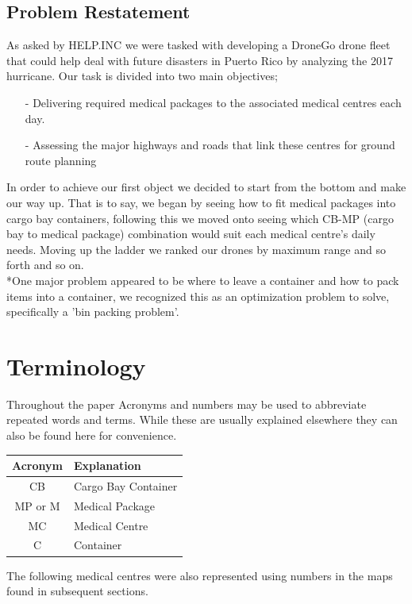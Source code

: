 \documentclass[a4paper,12pt]{article}
\begin{document}
\subsection{Problem Restatement}
As asked by HELP.INC we were tasked with developing a DroneGo drone fleet that could help deal with future disasters in
Puerto Rico by analyzing the 2017 hurricane. Our task is divided into two main objectives;
\begin{itemize}
\item[-]Delivering required medical packages to the associated medical centres each day.
\item[-]Assessing the major highways and roads that link these centres for ground route planning
\end{itemize}
In order to achieve our first object we decided to start from the bottom and make our way up. That is to say, we began by seeing how to fit medical packages into cargo bay containers, following this
we moved onto seeing which CB-MP (cargo bay to medical package) combination would suit each medical centre's daily needs. Moving up the ladder we ranked our drones by maximum range and so forth and so on.
\\*One major problem appeared to be where to leave a container and how to pack items into a container, we recognized this as an optimization problem to solve, specifically a 'bin packing problem'.

\section{Terminology}
Throughout the paper Acronyms and numbers may be used to abbreviate repeated words and terms. While these are usually explained elsewhere they can also be found here for convenience.

\begin{center}
\begin{tabular}{ |c|l| }
\hline
 \bf{Acronym} & \bf{Explanation}  \\\hline
 CB & Cargo Bay Container  \\
 MP or M & Medical Package \\
 MC & Medical Centre\\
 C & Container \\
 \hline
\end{tabular}
\end{center}
The following medical centres were also represented using numbers in the maps found in subsequent sections.
\end{document}
